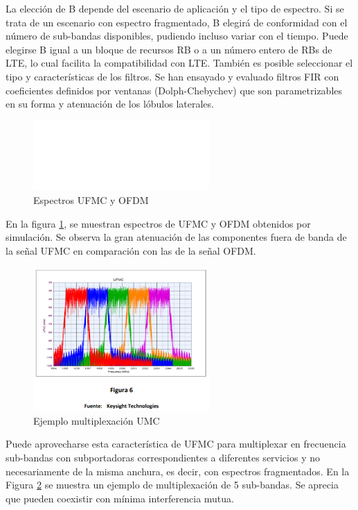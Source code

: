 \documentclass[]{article}
\begin{document}
La elección de B depende del escenario de aplicación y el tipo de espectro. Si se trata de un escenario con espectro fragmentado, B elegirá de conformidad con el número de sub-bandas disponibles, pudiendo incluso variar con el tiempo. Puede elegirse B igual a un bloque de recursos RB o a un número entero de RBs de LTE, lo cual facilita la compatibilidad con LTE. También es posible seleccionar el tipo y características de los filtros. Se han ensayado y evaluado filtros FIR con coeficientes definidos por ventanas (Dolph-Chebychev) que son parametrizables en su forma y atenuación de los lóbulos laterales.\\
 

\begin{figure}[h!]
	\centering
	\includegraphics[width=0.6\textwidth]{Imagenes/UMC.png}
	\caption{Espectros UFMC y OFDM}
	\label{fig:UMC}
\end{figure}

En la figura \ref{fig:UMC}, se muestran espectros de UFMC y OFDM obtenidos por simulación. Se observa la gran atenuación de las componentes fuera de banda de la señal UFMC en comparación con las de la señal OFDM.\\ 

\begin{figure}[h!]
	\centering
	\includegraphics[width=0.6\textwidth]{Imagenes/UMC2.png}
	\caption{Ejemplo multiplexación UMC}
	\label{fig:UMC2}
\end{figure}


Puede aprovecharse esta característica de UFMC para multiplexar en frecuencia sub-bandas con subportadoras correspondientes a diferentes servicios y no necesariamente de la misma anchura, es decir, con espectros fragmentados. 
En la Figura \ref{fig:UMC2} se muestra un ejemplo de multiplexación de 5 sub-bandas. Se aprecia que pueden coexistir con mínima interferencia mutua.\\ 
\end{document}
